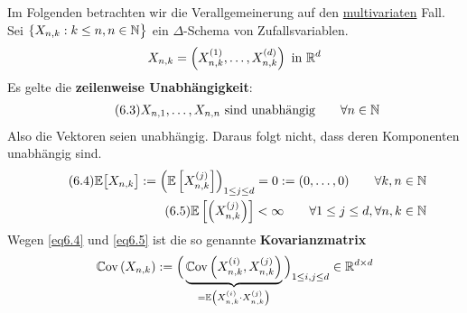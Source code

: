 Im Folgenden betrachten wir die Verallgemeinerung auf den \underline{multivariaten} Fall.\\
Sei $\lbrace X_{n,k}:k\leq n,n\in\mathbb{N}\big\rbrace$ ein $\Delta$-Schema von Zufallsvariablen.
\begin{align*}
X_{n,k}=\left(X_{n,k}^{(1)},\ldots,X_{n,k}^{(d)}\right)\text{ in }\mathbb{R}^d
\end{align*}
Es gelte die \textbf{zeilenweise Unabhängigkeit}:
\begin{align}\label{eq6.3}\tag{6.3}
X_{n,1},\ldots,X_{n,n}\text{ sind unabhängig}\qquad\forall n\in\mathbb{N}
\end{align}
Also die Vektoren seien unabhängig. Daraus folgt nicht, dass deren Komponenten unabhängig sind.
\begin{align}\label{eq6.4}\tag{6.4}
\mathbb{E}\big[X_{n,k}\big]:=\left(\mathbb{E}\left[X_{n,k}^{(j)}\right]\right)_{1\leq j\leq d}=0:=(0,\ldots,0)\qquad\forall k,n\in\mathbb{N}\\
\label{eq6.5}\tag{6.5}
\mathbb{E}\left[\left(X_{n,k}^{(j)}\right)\right]<\infty\qquad\forall 1\leq j\leq d,\forall n,k\in\mathbb{N}
\end{align}
Wegen \eqref{eq6.4} und \eqref{eq6.5} ist die so genannte \textbf{Kovarianzmatrix}
\begin{align*}
\mathbb{C}\text{ov}\left(X_{n,k}\right):=\Big(\underbrace{\mathbb{C}\text{ov}\left(X_{n,k}^{(i)},X_{n,k}^{(j)}\right)}_{=\mathbb{E}\left(X_{n,k}^{(i)}\cdot X_{n,k}^{(j)}\right)}\Big)_{1\leq i,j\leq d}\in\mathbb{R}^{d\times d}
\end{align*}


